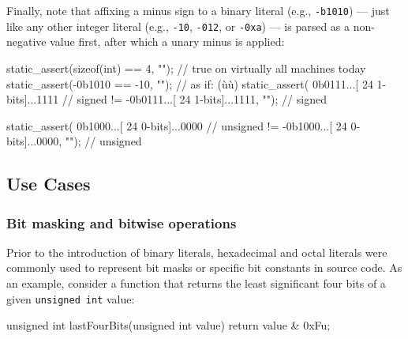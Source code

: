 \noindent Finally, note that affixing a minus sign to a binary
literal (e.g., \lstinline!-b1010!) --- just like any other integer literal
(e.g., \lstinline!-10!, \lstinline!-012!, or \lstinline!-0xa!) --- is parsed as a
non-negative value first, after which a unary minus is applied:

\begin{emcppslisting}[emcppsignore={Invalid Descriptive Literals}]
static_assert(sizeof(int) == 4, "");  // true on virtually all machines today
static_assert(-0b1010 == -10, "");    // as if: (ù{}ù)
static_assert( 0b0111...[ 24 1-bits]...1111       //   signed
           != -0b0111...[ 24 1-bits]...1111, ""); //   signed

static_assert( 0b1000...[ 24 0-bits]...0000       // unsigned
           != -0b1000...[ 24 0-bits]...0000, ""); // unsigned
\end{emcppslisting}




\subsection[Use Cases]{Use Cases}\label{use-cases}

\subsubsection[Bit masking and bitwise operations]{Bit masking and bitwise operations}\label{bit-masking-and-bitwise-operations}

Prior to the introduction of binary literals, hexadecimal and octal literals were commonly used to represent bit masks or
specific bit constants in source code.
As an example, consider a
function that returns the least significant four bits of a given
\lstinline!unsigned!~\lstinline!int! value:

\begin{emcppslisting}
unsigned int lastFourBits(unsigned int value)
{
    return value & 0xFu;
}
\end{emcppslisting}


